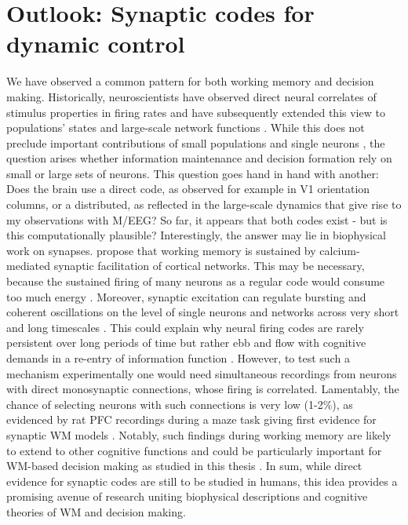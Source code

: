 \section{Outlook: Synaptic codes for dynamic control}
We have observed a common pattern for both working memory and decision making. Historically, neuroscientists have observed direct neural correlates of stimulus properties in firing rates \parencite[e.g.][]{Kim1999,Romo1999} and have subsequently extended this view to populations’ states and large-scale network functions \parencite{Barak2010,Lundqvist2018,Siegel2012}. While this does not preclude important contributions of small populations and single neurons \parencite{Shadlen2013,Shadlen1998}, the question arises whether information maintenance and decision formation rely on small or large sets of neurons. This question goes hand in hand with another: Does the brain use a direct code, as observed for example in V1 orientation columns, or a distributed, as reflected in the large-scale dynamics that give rise to my observations with M/EEG? So far, it appears that both codes exist - but is this computationally plausible? 
Interestingly, the answer may lie in biophysical work on synapses. \textcite{Mongillo2008} propose that working memory is sustained by calcium-mediated synaptic facilitation of cortical networks. This may be necessary, because the sustained firing of many neurons as a regular code would consume too much energy \parencite{Laughlin2001}. Moreover, synaptic excitation can regulate bursting and coherent oscillations on the level of single neurons and networks across very short and long timescales \parencite{Durstewitz2009}. This could explain why neural firing codes are rarely persistent over long periods of time but rather ebb and flow with cognitive demands in a re-entry of information function \parencite{Compte2000,Fuster2012,Fuster2015,Stokes2015,Verduzco-Flores2009,Wang2013}. However, to test such a mechanism experimentally one would need simultaneous recordings from neurons with direct monosynaptic connections, whose firing is correlated. Lamentably, the chance of selecting neurons with such connections is very low (1-2\%), as evidenced by rat PFC recordings during a maze task giving first evidence for synaptic WM models \parencite{Fujisawa2008}. Notably, such findings during working memory are likely to extend to other cognitive functions and could be particularly important for WM-based decision making as studied in this thesis \parencite[see also][]{Stokes2013}. In sum, while direct evidence for synaptic codes are still to be studied in humans, this idea provides a promising avenue of research uniting biophysical descriptions and cognitive theories of WM and decision making.

